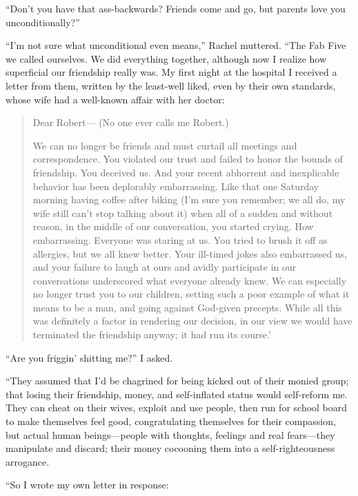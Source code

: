 ``Don't you have that ass-backwards? Friends come and go, but parents
love you unconditionally?''

``I'm not sure what unconditional even means,'' Rachel muttered. ``The
Fab Five we called ourselves. We did everything together, although now I
realize how superficial our friendship really was. My first night at the
hospital I received a letter from them, written by the least-well liked,
even by their own standards, whose wife had a well-known affair with her
doctor:

\begin{quote}
Dear Robert--- (No one ever calls me Robert.)

We can no longer be friends and must curtail all meetings and
correspondence. You violated our trust and failed to honor the bounds of
friendship. You deceived us. And your recent abhorrent and inexplicable
behavior has been deplorably embarrassing. Like that one Saturday
morning having coffee after biking (I'm sure you remember; we all do, my
wife still can't stop talking about it) when all of a sudden and without
reason, in the middle of our conversation, you started crying. How
embarrassing. Everyone was staring at us. You tried to brush it off as
allergies, but we all knew better. Your ill-timed jokes also embarrassed
us, and your failure to laugh at ours and avidly participate in our
conversations underscored what everyone already knew. We can especially
no longer trust you to our children, setting such a poor example of what
it means to be a man, and going against God-given precepts. While all
this was definitely a factor in rendering our decision, in our view we
would have terminated the friendship anyway; it had run its course.'
\end{quote}

``Are you friggin' shitting me?'' I asked.

``They assumed that I'd be chagrined for being kicked out of their monied
group; that losing their friendship, money, and self-inflated status
would self-reform me. They can cheat on their wives, exploit and use
people, then run for school board to make themselves feel good,
congratulating themselves for their compassion, but actual human
beings---people with thoughts, feelings and real fears---they manipulate
and discard; their money cocooning them into a self-righteousness
arrogance.

``So I wrote my own letter in response:

